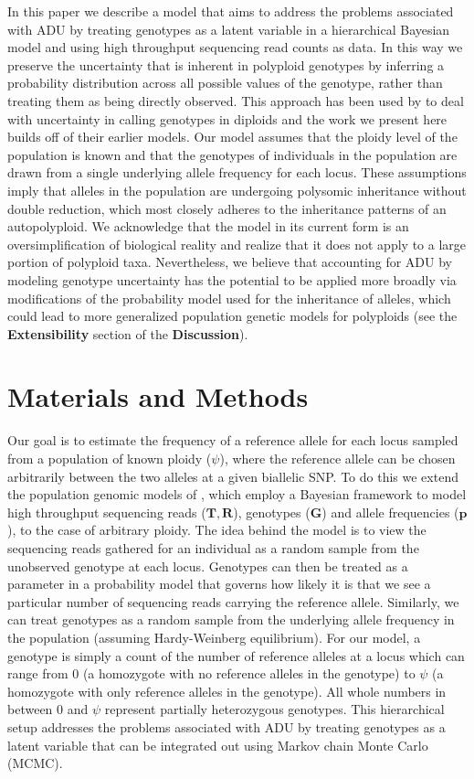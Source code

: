 \documentclass[11pt,english,letterpaper,oneside]{article}
\begin{document}
In this paper we describe a model that aims to address the problems associated with ADU by treating genotypes as a latent variable in a hierarchical Bayesian model and using high throughput sequencing read counts as data. In this way we preserve the uncertainty that is inherent in polyploid genotypes by inferring a probability distribution across all possible values of the genotype, rather than treating them as being directly observed. This approach has been used by \cite{buerkle2013popModels} to deal with uncertainty in calling genotypes in diploids and the work we present here builds off of their earlier models. Our model assumes that the ploidy level of the population is known and that the genotypes of individuals in the population are drawn from a single underlying allele frequency for each locus. These assumptions imply that alleles in the population are undergoing polysomic inheritance without double reduction, which most closely adheres to the inheritance patterns of an autopolyploid. We acknowledge that the model in its current form is an oversimplification of biological reality and realize that it does not apply to a large portion of polyploid taxa. Nevertheless, we believe that accounting for ADU by modeling genotype uncertainty has the potential to be applied more broadly via modifications of the probability model used for the inheritance of alleles, which could lead to more generalized population genetic models for polyploids (see the \textbf{Extensibility} section of the \textbf{Discussion}).
\medskip

\section{Materials and Methods}        %

\noindent Our goal is to estimate the frequency of a reference allele for each locus sampled from a population of known ploidy ($\psi$), where the reference allele can be chosen arbitrarily between the two alleles at a given biallelic SNP. To do this we extend the population genomic models of \cite{buerkle2013popModels}, which employ a Bayesian framework to model high throughput sequencing reads ($\bm{T},\bm{R}$), genotypes ($\bm{G}$) and allele frequencies ($\bm{p}$), to the case of arbitrary ploidy. The idea behind the model is to view the sequencing reads gathered for an individual as a random sample from the unobserved genotype at each locus. Genotypes can then be treated as a parameter in a probability model that governs how likely it is that we see a particular number of sequencing reads carrying the reference allele. Similarly, we can treat genotypes as a random sample from the underlying allele frequency in the population (assuming Hardy-Weinberg equilibrium). For our model, a genotype is simply a count of the number of reference alleles at a locus which can range from 0 (a homozygote with no reference alleles in the genotype) to $\psi$ (a homozygote with only reference alleles in the genotype). All whole numbers in between 0 and $\psi$ represent partially heterozygous genotypes. This hierarchical setup addresses the problems associated with ADU by treating genotypes as a latent variable that can be integrated out using Markov chain Monte Carlo (MCMC).
\end{document}
